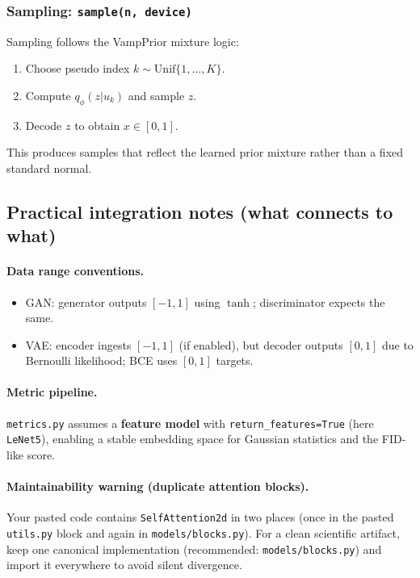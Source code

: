 \subsubsection*{Sampling: \texttt{sample(n, device)}}
Sampling follows the VampPrior mixture logic:
\begin{enumerate}
  \item Choose pseudo index \(k\sim \mathrm{Unif}\{1,\dots,K\}\).
  \item Compute \(q_\phi(z|u_k)\) and sample \(z\).
  \item Decode \(z\) to obtain \(x\in[0,1]\).
\end{enumerate}
This produces samples that reflect the learned prior mixture rather than a fixed standard normal.

\subsection{Practical integration notes (what connects to what)}
\label{subsec:code_integration}

\paragraph{Data range conventions.}
\begin{itemize}
  \item GAN: generator outputs \([-1,1]\) using \(\tanh\); discriminator expects the same.
  \item VAE: encoder ingests \([-1,1]\) (if enabled), but decoder outputs \([0,1]\) due to Bernoulli likelihood; BCE uses \([0,1]\) targets.
\end{itemize}

\paragraph{Metric pipeline.}
\texttt{metrics.py} assumes a \textbf{feature model} with \texttt{return\_features=True} (here \texttt{LeNet5}), enabling a stable embedding space for Gaussian statistics and the FID-like score.

\paragraph{Maintainability warning (duplicate attention blocks).}
Your pasted code contains \texttt{SelfAttention2d} in two places (once in the pasted \texttt{utils.py} block and again in \texttt{models/blocks.py}). For a clean scientific artifact, keep one canonical implementation (recommended: \texttt{models/blocks.py}) and import it everywhere to avoid silent divergence.

